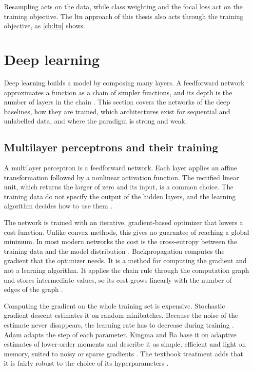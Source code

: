 Resampling acts on the data, while class weighting and the focal loss act on
the training objective. The \gls{ltn} approach of this thesis also acts
through the training objective, as \cref{ch:ltn} shows.

\section{Deep learning}
\label{sec:deep-learning}

Deep learning builds a model by composing many layers. A feedforward network
approximates a function as a chain of simpler functions, and its depth is the
number of layers in the chain \citep{goodfellow2016deep}. This section covers
the networks of the deep baselines, how they are trained, which architectures
exist for sequential and unlabelled data, and where the paradigm is strong and
weak.

\subsection{Multilayer perceptrons and their training}
\label{sec:mlp-training}

A multilayer perceptron is a feedforward network. Each layer applies an affine
transformation followed by a nonlinear activation function. The rectified
linear unit, which returns the larger of zero and its input, is a common
choice. The training data do not specify the output of the hidden layers, and
the learning algorithm decides how to use them \citep{goodfellow2016deep}.

The network is trained with an iterative, gradient-based optimizer that lowers
a cost function. Unlike convex methods, this gives no guarantee of reaching a
global minimum. In most modern networks the cost is the cross-entropy between
the training data and the model distribution \citep{goodfellow2016deep}.
Backpropagation computes the gradient that the optimizer needs. It is a
method for computing the gradient and not a learning algorithm. It applies the
chain rule through the computation graph and stores intermediate values, so
its cost grows linearly with the number of edges of the graph
\citep{goodfellow2016deep}.

Computing the gradient on the whole training set is expensive. Stochastic
gradient descent estimates it on random minibatches. Because the noise of the
estimate never disappears, the learning rate has to decrease during training
\citep{goodfellow2016deep}. Adam adapts the step of each parameter. Kingma
and Ba base it on adaptive estimates of lower-order moments and describe it
as simple, efficient and light on memory, suited to noisy or sparse gradients
\citep{kingma2015adam}. The textbook treatment adds that it is fairly robust
to the choice of its hyperparameters \citep{goodfellow2016deep}.

